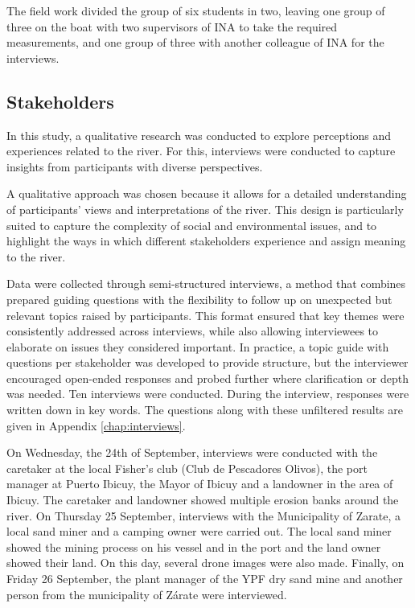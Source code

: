 The field work divided the group of six students in two, leaving one group of three on the boat with two supervisors of INA to take the required measurements, and one group of three with another colleague of INA for the interviews.

\subsection{Stakeholders}
\label{sec:stakeholder methods}
In this study, a qualitative research was conducted to explore perceptions and experiences related to the river. For this, interviews were conducted to capture insights from participants with diverse perspectives.

A qualitative approach was chosen because it allows for a detailed understanding of participants’ views and interpretations of the river. This design is particularly suited to capture the complexity of social and environmental issues, and to highlight the ways in which different stakeholders experience and assign meaning to the river.

Data were collected through semi-structured interviews, a method that combines prepared guiding questions with the flexibility to follow up on unexpected but relevant topics raised by participants. This format ensured that key themes were consistently addressed across interviews, while also allowing interviewees to elaborate on issues they considered important. In practice, a topic guide with questions per stakeholder was developed to provide structure, but the interviewer encouraged open-ended responses and probed further where clarification or depth was needed. Ten interviews were conducted. During the interview, responses were written down in key words. The questions along with these unfiltered results are given in Appendix \ref{chap:interviews}.

On Wednesday, the 24th of September, interviews were conducted with the caretaker at the local Fisher's club (Club de Pescadores Olivos), the port manager at Puerto Ibicuy, the Mayor of Ibicuy and a landowner in the area of Ibicuy. The caretaker and landowner showed multiple erosion banks around the river. On Thursday 25 September, interviews with the Municipality of Zarate, a local sand miner and a camping owner were carried out. The local sand miner showed the mining process on his vessel and in the port and the land owner showed their land. On this day, several drone images were also made. Finally, on Friday 26 September, the plant manager of the YPF dry sand mine and another person from the municipality of Zárate were interviewed. 

